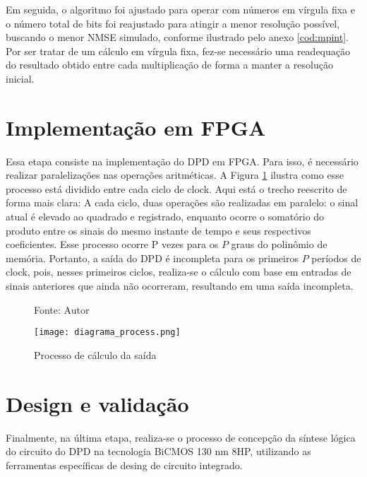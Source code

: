 Em seguida, o algoritmo foi ajustado para operar com números em vírgula fixa e o número total de bits foi reajustado para atingir a menor resolução possível, buscando o menor NMSE simulado, conforme ilustrado pelo anexo \ref{cod:mpint}. Por ser tratar de um cálculo em vírgula fixa, fez-se necessário uma readequação do resultado obtido entre cada multiplicação de forma a manter a resolução inicial.

\section{Implementação em FPGA}
Essa etapa consiste na implementação do DPD em FPGA. Para isso, é necessário realizar paralelizações nas operações aritméticas. A Figura \ref{fig:diagramaprocess} ilustra como esse processo está dividido entre cada ciclo de clock. Aqui está o trecho reescrito de forma mais clara: A cada ciclo, duas operações são realizadas em paralelo: o sinal atual é elevado ao quadrado e registrado, enquanto ocorre o somatório do produto entre os sinais do mesmo instante de tempo e seus respectivos coeficientes. Esse processo ocorre P vezes para os \( P \) graus do polinômio de memória. Portanto, a saída do DPD é incompleta para os primeiros \( P \) períodos de clock, pois, nesses primeiros ciclos, realiza-se o cálculo com base em entradas de sinais anteriores que ainda não ocorreram, resultando em uma saída incompleta.

\begin{figure}[ht!]
  \centering
  \captionsetup{justification=centering}
  \caption*{Fonte: Autor}
  \texttt{[image: diagrama\_process.png]}
  \caption{Processo de cálculo da saída}
  \label{fig:diagramaprocess}
\end{figure}

\section{Design e validação}
Finalmente, na última etapa, realiza-se o processo de concepção da síntese lógica do circuito do DPD  na tecnologia BiCMOS 130 nm 8HP, utilizando as ferramentas específicas de desing de circuito integrado. 
